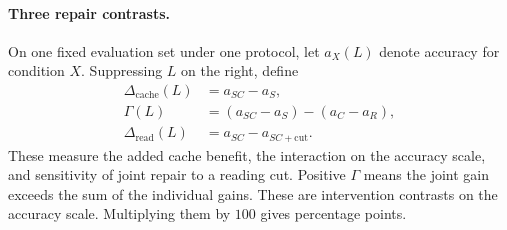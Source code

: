 \paragraph{Three repair contrasts.}
On one fixed evaluation set under one protocol, let $a_X(L)$ denote
accuracy for condition $X$. Suppressing $L$ on the right, define
\begin{equation}
\begin{aligned}
\Delta_{\mathrm{cache}}(L)&=a_{SC}-a_S,\\
\Gamma(L)&=(a_{SC}-a_S)-(a_C-a_R),\\
\Delta_{\mathrm{read}}(L)&=a_{SC}-a_{SC+\mathrm{cut}}.
\end{aligned}
\label{eq:repair-effects}
\end{equation}
These measure the added cache benefit, the interaction on the accuracy
scale, and sensitivity of joint repair to a reading cut.
Positive $\Gamma$ means the joint gain exceeds the sum of the individual
gains. These are intervention contrasts on the accuracy scale.
Multiplying them by $100$ gives percentage points.
